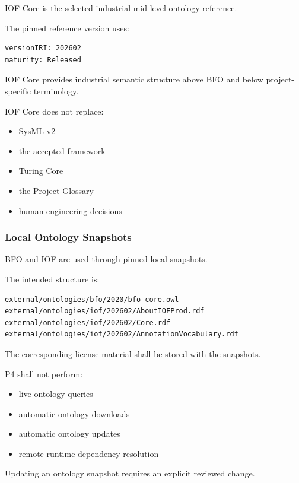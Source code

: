 IOF Core is the selected industrial mid-level ontology reference.

The pinned reference version uses:

\begin{verbatim}
versionIRI: 202602
maturity: Released
\end{verbatim}

IOF Core provides industrial semantic structure above BFO and below project-specific terminology.

IOF Core does not replace:

\begin{itemize}
\tightlist
\item
  SysML v2
\item
  the accepted framework
\item
  Turing Core
\item
  the Project Glossary
\item
  human engineering decisions
\end{itemize}

\hypertarget{local-ontology-snapshots}{%
\subsubsection{Local Ontology Snapshots}\label{local-ontology-snapshots}}

BFO and IOF are used through pinned local snapshots.

The intended structure is:

\begin{verbatim}
external/ontologies/bfo/2020/bfo-core.owl
external/ontologies/iof/202602/AboutIOFProd.rdf
external/ontologies/iof/202602/Core.rdf
external/ontologies/iof/202602/AnnotationVocabulary.rdf
\end{verbatim}

The corresponding license material shall be stored with the snapshots.

P4 shall not perform:

\begin{itemize}
\tightlist
\item
  live ontology queries
\item
  automatic ontology downloads
\item
  automatic ontology updates
\item
  remote runtime dependency resolution
\end{itemize}

Updating an ontology snapshot requires an explicit reviewed change.

